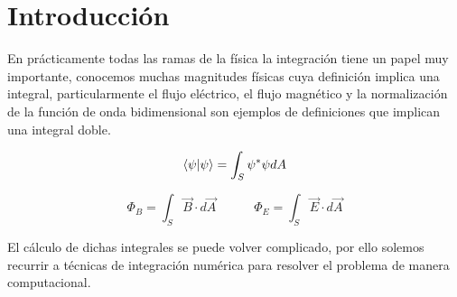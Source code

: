\section{Introducción}

\noindent En prácticamente todas las ramas de la física la integración tiene un papel muy importante, conocemos muchas magnitudes físicas cuya definición implica una integral, particularmente el flujo eléctrico, el flujo magnético y la normalización de la función de onda bidimensional son ejemplos de definiciones que implican una integral doble.

\begin{equation*}
  \braket{\psi | \psi} = \displaystyle\int_{S} \psi^{*} \psi dA
\end{equation*}

\begin{equation*}
  \Phi_B = \displaystyle\int_{S} \vec{B} \cdot  d\vec{A}
  \quad \quad \quad
  \Phi_E = \displaystyle\int_{S} \vec{E} \cdot  d\vec{A}
\end{equation*}

El cálculo de dichas integrales se puede volver complicado, por ello solemos recurrir a técnicas de integración numérica para resolver el problema de manera computacional.